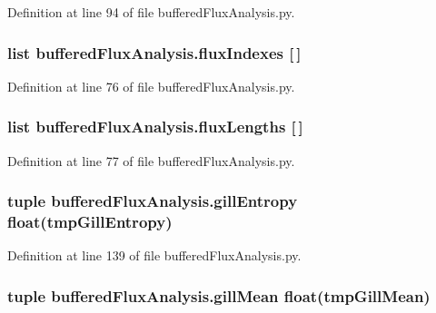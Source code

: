 Definition at line 94 of file buffered\-Flux\-Analysis.\-py.

\hypertarget{namespacebuffered_flux_analysis_ae24a834136795f8237a6833f27b1d101}{
\subsubsection[{flux\-Indexes}]{\setlength{\rightskip}{0pt plus 5cm}list buffered\-Flux\-Analysis.\-flux\-Indexes \mbox{[}$\,$\mbox{]}}}\label{namespacebuffered_flux_analysis_ae24a834136795f8237a6833f27b1d101}


Definition at line 76 of file buffered\-Flux\-Analysis.\-py.

\hypertarget{namespacebuffered_flux_analysis_ad325fa6a88238fd68ab3877253a8bfbb}{
\subsubsection[{flux\-Lengths}]{\setlength{\rightskip}{0pt plus 5cm}list buffered\-Flux\-Analysis.\-flux\-Lengths \mbox{[}$\,$\mbox{]}}}\label{namespacebuffered_flux_analysis_ad325fa6a88238fd68ab3877253a8bfbb}


Definition at line 77 of file buffered\-Flux\-Analysis.\-py.

\hypertarget{namespacebuffered_flux_analysis_ac596e19c308944b3c5504e92aa074de1}{
\subsubsection[{gill\-Entropy}]{\setlength{\rightskip}{0pt plus 5cm}tuple buffered\-Flux\-Analysis.\-gill\-Entropy float(tmp\-Gill\-Entropy)}}\label{namespacebuffered_flux_analysis_ac596e19c308944b3c5504e92aa074de1}


Definition at line 139 of file buffered\-Flux\-Analysis.\-py.

\hypertarget{namespacebuffered_flux_analysis_ab95141737b50ec6e5b0e3f622dfa9713}{
\subsubsection[{gill\-Mean}]{\setlength{\rightskip}{0pt plus 5cm}tuple buffered\-Flux\-Analysis.\-gill\-Mean float(tmp\-Gill\-Mean)}}\label{namespacebuffered_flux_analysis_ab95141737b50ec6e5b0e3f622dfa9713}


